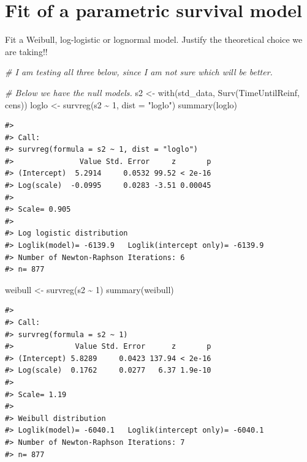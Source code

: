 \documentclass[
]{article}
\newenvironment{Shaded}{\begin{snugshade}}{\end{snugshade}}
\newcommand{\AttributeTok}[1]{\textcolor[rgb]{0.77,0.63,0.00}{#1}}
\newcommand{\CommentTok}[1]{\textcolor[rgb]{0.56,0.35,0.01}{\textit{#1}}}
\newcommand{\DecValTok}[1]{\textcolor[rgb]{0.00,0.00,0.81}{#1}}
\newcommand{\FunctionTok}[1]{\textcolor[rgb]{0.00,0.00,0.00}{#1}}
\newcommand{\NormalTok}[1]{#1}
\newcommand{\OtherTok}[1]{\textcolor[rgb]{0.56,0.35,0.01}{#1}}
\newcommand{\SpecialCharTok}[1]{\textcolor[rgb]{0.00,0.00,0.00}{#1}}
\newcommand{\StringTok}[1]{\textcolor[rgb]{0.31,0.60,0.02}{#1}}
\begin{document}
\hypertarget{fit-of-a-parametric-survival-model}{%
\section{Fit of a parametric survival model}\label{fit-of-a-parametric-survival-model}}

Fit a Weibull, log-logistic or lognormal model. Justify the theoretical choice we are taking!!

\begin{Shaded}
\begin{Highlighting}[]
\CommentTok{\# I am testing all three below, since I am not sure which will be better.}

\CommentTok{\# Below we have the null models. }
\NormalTok{s2 }\OtherTok{\textless{}{-}} \FunctionTok{with}\NormalTok{(std\_data, }\FunctionTok{Surv}\NormalTok{(TimeUntilReinf, cens))}
\NormalTok{loglo }\OtherTok{\textless{}{-}} \FunctionTok{survreg}\NormalTok{(s2 }\SpecialCharTok{\textasciitilde{}} \DecValTok{1}\NormalTok{, }\AttributeTok{dist =} \StringTok{"loglo"}\NormalTok{)  }
\FunctionTok{summary}\NormalTok{(loglo)}
\end{Highlighting}
\end{Shaded}

\begin{verbatim}
#> 
#> Call:
#> survreg(formula = s2 ~ 1, dist = "loglo")
#>               Value Std. Error     z       p
#> (Intercept)  5.2914     0.0532 99.52 < 2e-16
#> Log(scale)  -0.0995     0.0283 -3.51 0.00045
#> 
#> Scale= 0.905 
#> 
#> Log logistic distribution
#> Loglik(model)= -6139.9   Loglik(intercept only)= -6139.9
#> Number of Newton-Raphson Iterations: 6 
#> n= 877
\end{verbatim}

\begin{Shaded}
\begin{Highlighting}[]
\NormalTok{weibull }\OtherTok{\textless{}{-}} \FunctionTok{survreg}\NormalTok{(s2 }\SpecialCharTok{\textasciitilde{}} \DecValTok{1}\NormalTok{)}
\FunctionTok{summary}\NormalTok{(weibull)}
\end{Highlighting}
\end{Shaded}

\begin{verbatim}
#> 
#> Call:
#> survreg(formula = s2 ~ 1)
#>              Value Std. Error      z       p
#> (Intercept) 5.8289     0.0423 137.94 < 2e-16
#> Log(scale)  0.1762     0.0277   6.37 1.9e-10
#> 
#> Scale= 1.19 
#> 
#> Weibull distribution
#> Loglik(model)= -6040.1   Loglik(intercept only)= -6040.1
#> Number of Newton-Raphson Iterations: 7 
#> n= 877
\end{verbatim}
\end{document}
